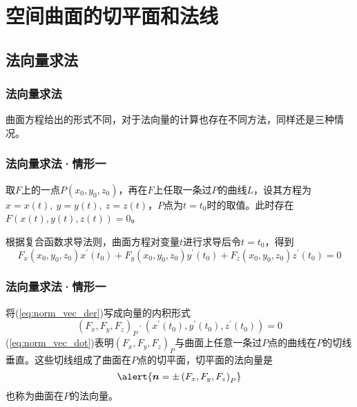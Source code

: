\section{空间曲面的切平面和法线}
\subsection{法向量求法}
\begin{frame}
    \frametitle{法向量求法}

    曲面方程给出的形式不同，对于法向量的计算也存在不同方法，同样还是三种情况。

\end{frame}

\begin{frame}
    \frametitle{法向量求法·情形一}

    \begin{center}
    \end{center}\vfill\pause

    取$F$上的一点$P(x_0,y_0,z_0)$，再在$F$上任取一条过$P$的曲线$L$，设其方程为$x=x(t),\ y=y(t),\ z=z(t)$，$P$点为$t=t_0$时的取值。此时存在$F\left(x(t),y(t),z(t)\right)=0$。\pause

    根据复合函数求导法则，曲面方程对变量$t$进行求导后令$t=t_0$，得到\pause
    \begin{equation}
        F_x(x_0,y_0,z_0)x^\prime(t_0)+F_y(x_0,y_0,z_0)y^\prime(t_0)+F_z(x_0,y_0,z_0)z^\prime(t_0)=0\label{eq:norm_vec_der}
    \end{equation}\vfill

\end{frame}

\begin{frame}
    \frametitle{法向量求法·情形一}

    将(\ref{eq:norm_vec_der})写成向量的内积形式\pause
    \begin{equation}
        \left(F_x,F_y,F_z\right)_P\cdot \left(x^\prime(t_0),y^\prime(t_0),z^\prime(t_0)\right)=0\label{eq:norm_vec_dot}
    \end{equation}\pause
    (\ref{eq:norm_vec_dot})表明$\left(F_x,F_y,F_z\right)_P$与曲面上任意一条过$P$点的曲线在$P$的切线垂直。这些切线组成了曲面在$P$点的\alert{切平面}，切平面的法向量是\pause
    \begin{equation}
        \alert{\boldsymbol{n}=\pm\left(F_x,F_y,F_z\right)_P}\label{eq:norm_vec1}
    \end{equation}\pause
    也称为曲面在$P$的\alert{法向量}。

\end{frame}

